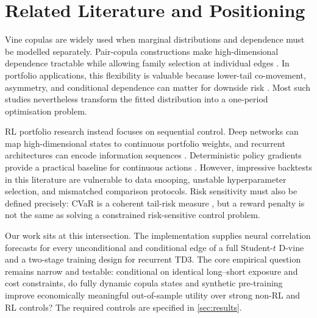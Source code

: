 \section{Related Literature and Positioning}
\label{sec:literature}

Vine copulas are widely used when marginal distributions and dependence must be modelled separately. Pair-copula constructions make high-dimensional dependence tractable while allowing family selection at individual edges \citep{aas_pair-copula_2009,dissmann_selecting_2012}. In portfolio applications, this flexibility is valuable because lower-tail co-movement, asymmetry, and conditional dependence can matter for downside risk \citep{jondeau_copula-garch_2006,sahamkhadam_portfolio_2023}. Most such studies nevertheless transform the fitted distribution into a one-period optimisation problem.

RL portfolio research instead focuses on sequential control. Deep networks can map high-dimensional states to continuous portfolio weights, and recurrent architectures can encode information sequences \citep{jiang_deep_2017,sezer_financial_2020}. Deterministic policy gradients provide a practical baseline for continuous actions \citep{lillicrap_continuous_2015}. However, impressive backtests in this literature are vulnerable to data snooping, unstable hyperparameter selection, and mismatched comparison protocols. Risk sensitivity must also be defined precisely: CVaR is a coherent tail-risk measure \citep{artzner_coherent_1999,rockafellar_optimization_2000}, but a reward penalty is not the same as solving a constrained risk-sensitive control problem.

Our work sits at this intersection. The implementation supplies neural correlation forecasts for every unconditional and conditional edge of a full Student-$t$ D-vine and a two-stage training design for recurrent TD3. The core empirical question remains narrow and testable: conditional on identical long--short exposure and cost constraints, do fully dynamic copula states and synthetic pre-training improve economically meaningful out-of-sample utility over strong non-RL and RL controls? The required controls are specified in \cref{sec:results}.
